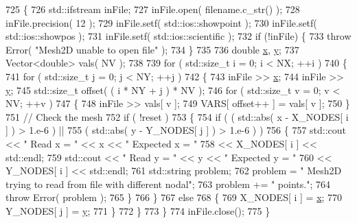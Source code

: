 \begin{DoxyCode}
725   \{
726     std::ifstream inFile;
727     inFile.open( filename.c\_str() );
728     inFile.precision( 12 );
729     inFile.setf( std::ios::showpoint );
730     inFile.setf( std::ios::showpos );
731     inFile.setf( std::ios::scientific );
732     \textcolor{keywordflow}{if} (!inFile) \{
733       \textcolor{keywordflow}{throw} Error( \textcolor{stringliteral}{"Mesh2D unable to open file"} );
734     \}
735 
736     \textcolor{keywordtype}{double} \hyperlink{namespaceHeat__plot_aa88370c16b85b784ccbde3ed88bc1991}{x}, \hyperlink{ODE__BVP__test_8cpp_adf764cbdea00d65edcd07bb9953ad2b7ae1f9fdb8b786c63efc4ce44eeacd17f2}{y};
737     Vector<double> vals( NV );
738 
739     \textcolor{keywordflow}{for} ( std::size\_t i = 0; i < NX; ++i )
740     \{
741       \textcolor{keywordflow}{for} ( std::size\_t j = 0; j < NY; ++j )
742       \{
743         inFile >> \hyperlink{namespaceHeat__plot_aa88370c16b85b784ccbde3ed88bc1991}{x};
744         inFile >> \hyperlink{ODE__BVP__test_8cpp_adf764cbdea00d65edcd07bb9953ad2b7ae1f9fdb8b786c63efc4ce44eeacd17f2}{y};
745         std::size\_t offset( ( i * NY + j ) * NV );
746         \textcolor{keywordflow}{for} ( std::size\_t v = 0; v < NV; ++v )
747         \{
748           inFile >> vals[ v ];
749           VARS[ offset++ ] = vals[ v ];
750         \}
751         \textcolor{comment}{// Check the mesh}
752         \textcolor{keywordflow}{if} ( !reset )
753             \{
754                 \textcolor{keywordflow}{if} ( ( std::abs( x - X\_NODES[ i ] ) > 1.e-6 ) ||
755                ( std::abs( y - Y\_NODES[ j ] ) > 1.e-6 ) )
756                 \{
757                     std::cout << \textcolor{stringliteral}{" Read x = "} << x << \textcolor{stringliteral}{" Expected x = "}
758                       << X\_NODES[ i ] << std::endl;
759             std::cout << \textcolor{stringliteral}{" Read y = "} << y << \textcolor{stringliteral}{" Expected y = "}
760                       << Y\_NODES[ i ] << std::endl;
761             std::string problem;
762             problem  = \textcolor{stringliteral}{" Mesh2D trying to read from file with different nodal"};
763             problem += \textcolor{stringliteral}{" points."};
764                     \textcolor{keywordflow}{throw} Error( problem );
765                 \}
766             \}
767             \textcolor{keywordflow}{else}
768             \{
769                 X\_NODES[ i ] = \hyperlink{namespaceHeat__plot_aa88370c16b85b784ccbde3ed88bc1991}{x};
770           Y\_NODES[ j ] = \hyperlink{ODE__BVP__test_8cpp_adf764cbdea00d65edcd07bb9953ad2b7ae1f9fdb8b786c63efc4ce44eeacd17f2}{y};
771             \}
772       \}
773     \}
774     inFile.close();
775   \}
\end{DoxyCode}
\mbox{\label{classLuna_1_1Mesh2D_a3874356b327d21ac65b16d181a4240f3}} 
